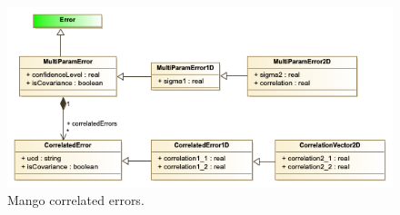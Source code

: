 \documentclass[11pt,a4paper]{ivoa}
\begin{document}
\begin{figure}
  \includegraphics[width=1.0\textwidth]{../model/mangoErrors.png}
  \caption{Mango correlated errors.}
  \label{fig:errors}
\end{figure}
\end{document}
